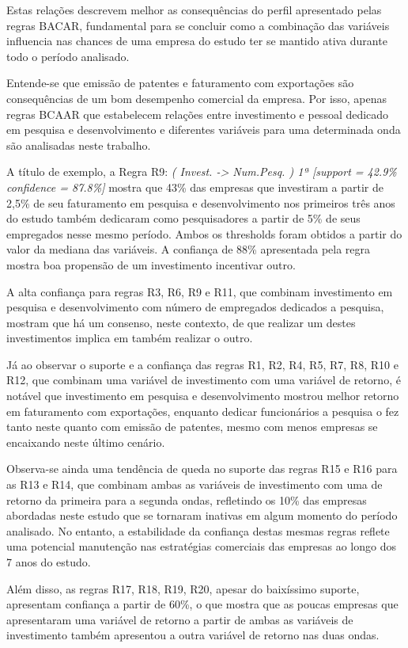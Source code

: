 \documentclass[12pt]{article}
\begin{document}
Estas relações descrevem melhor as consequências do perfil apresentado pelas regras BACAR, fundamental para se concluir como a combinação das variáveis influencia nas chances de uma empresa do estudo ter se mantido ativa durante todo o período analisado.

Entende-se que emissão de patentes e faturamento com exportações são consequências de um bom desempenho comercial da empresa. Por isso, apenas regras BCAAR que estabelecem relações entre investimento e pessoal dedicado em pesquisa e desenvolvimento e diferentes variáveis para uma determinada onda são analisadas neste trabalho.

A título de exemplo, a Regra R9: \textit{( Invest. -> Num.Pesq. ) 1ª [support = 42.9\% confidence = 87.8\%]} mostra que 43\% das empresas que investiram a partir de 2,5\% de seu faturamento em pesquisa e desenvolvimento nos primeiros três anos do estudo também dedicaram como pesquisadores a partir de 5\% de seus empregados nesse mesmo período. Ambos os thresholds foram obtidos a partir do valor da mediana das variáveis. A confiança de 88\% apresentada pela regra mostra boa propensão de um investimento incentivar outro.

A alta confiança para regras R3, R6, R9 e R11, que combinam investimento em pesquisa e desenvolvimento com número de empregados dedicados a pesquisa, mostram que há um consenso, neste contexto, de que realizar um destes investimentos implica em também realizar o outro.

Já ao observar o suporte e a confiança das regras R1, R2, R4, R5, R7, R8, R10 e R12, que combinam uma variável de investimento com uma variável de retorno, é notável que investimento em pesquisa e desenvolvimento mostrou melhor retorno em faturamento com exportações, enquanto dedicar funcionários a pesquisa o fez tanto neste quanto com emissão de patentes, mesmo com menos empresas se encaixando neste último cenário.

Observa-se ainda uma tendência de queda no suporte das regras R15 e R16 para as R13 e R14, que combinam ambas as variáveis de investimento com uma de retorno da primeira para a segunda ondas, refletindo os 10\% das empresas abordadas neste estudo que se tornaram inativas em algum momento do período analisado. No entanto, a estabilidade da confiança destas mesmas regras reflete uma potencial manutenção nas estratégias comerciais das empresas ao longo dos 7 anos do estudo.

Além disso, as regras R17, R18, R19, R20, apesar do baixíssimo suporte, apresentam confiança a partir de 60\%, o que mostra que as poucas empresas que apresentaram uma variável de retorno a partir de ambas as variáveis de investimento também apresentou a outra variável de retorno nas duas ondas.
\end{document}
